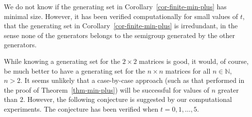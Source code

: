 \documentclass{amsart}
\newcommand{\N}{\mathbb{N}}
\numberwithin{equation}{section}
\theoremstyle{definition}
\begin{document}
We do not know if the generating set in Corollary~\ref{cor-finite-min-plus} has
minimal size. However, it has been verified computationally for small values of
$t$, that the generating set in Corollary~\ref{cor-finite-min-plus} is
irredundant, in the sense none of the generators belongs to the semigroup
generated by the other generators. 

While knowing a generating set for the $2\times 2$ matrices is good, it would,
of course, be much better to have a generating set for the $n\times n$ matrices
for all $n \in \N$, $n > 2$. It seems unlikely that a case-by-case approach
(such as that performed in the proof of Theorem~\ref{thm-min-plus}) will be
successful for values of $n$ greater than $2$.  However, the following
conjecture is suggested by our computational experiments. The conjecture has
been verified when $t = 0, 1, \ldots, 5$.
\end{document}

